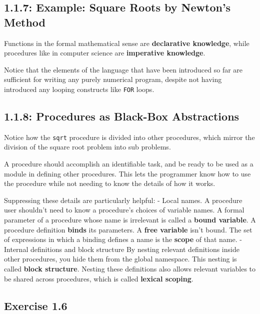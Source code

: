 \documentclass[final,fleqn,titlepage]{article}
\begin{document}
\subsection{1.1.7: Example: Square Roots by Newton’s Method}
\label{sec:orgdef6b1a}
Functions in the formal mathematical sense are \textbf{declarative knowledge}, while
procedures like in computer science are \textbf{imperative knowledge}.

Notice that the elements of the language that have been introduced so far are
sufficient for writing any purely numerical program, despite not having
introduced any looping constructs like \texttt{FOR} loops.

\subsection{1.1.8: Procedures as Black-Box Abstractions}
\label{sec:orgf83c3d6}
Notice how the \texttt{sqrt} procedure is divided into other procedures, which mirror
the division of the square root problem into sub problems.

A procedure should accomplish an identifiable task, and be ready to be used as a
module in defining other procedures. This lets the programmer know how to use
the procedure while not needing to know the details of how it works.

Suppressing these details are particularly helpful: - Local names. A procedure
user shouldn't need to know a procedure's choices of variable names. A formal
parameter of a procedure whose name is irrelevant is called a \textbf{bound variable}.
A procedure definition \textbf{binds} its parameters. A \textbf{free variable} isn't bound.
The set of expressions in which a binding defines a name is the \textbf{scope} of that
name. - Internal definitions and block structure By nesting relevant definitions
inside other procedures, you hide them from the global namespace. This nesting
is called \textbf{block structure}. Nesting these definitions also allows relevant
variables to be shared across procedures, which is called \textbf{lexical scoping}.
\subsection{Exercise 1.6}
\label{sec:org1b7344d}
\end{document}
